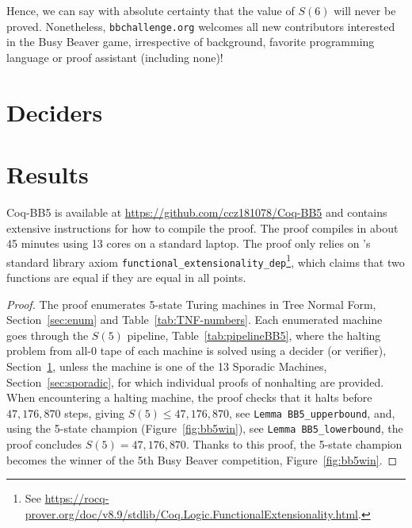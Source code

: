 \documentclass[a4paper,british]{article}
\theoremstyle{definition} %
\numberwithin{equation}{section}
\theoremstyle{definition} %
\newcommand{\numSporadic}{13\xspace}
\newcommand{\CoqBB}{Coq-BB5\xspace}
\begin{document}
Hence, we can say with absolute certainty that the value of $S(6)$ will never be proved. Nonetheless, \texttt{bbchallenge.org} welcomes all new contributors interested in the Busy Beaver game, irrespective of background, favorite programming language or proof assistant (including none)!



\newpage



\section{Deciders}\label{sec:deciders}







% 

\newpage




\newpage


\newpage
\section{Results}\label{sec:results}

\CoqBB is available at \url{https://github.com/ccz181078/Coq-BB5} and contains extensive instructions for how to compile the proof. The proof compiles in about 45 minutes using 13 cores on a standard laptop. The proof only relies on \Coq's standard library axiom \texttt{functional\_extensionality\_dep}\footnote{See \url{https://rocq-prover.org/doc/v8.9/stdlib/Coq.Logic.FunctionalExtensionality.html}.}, which claims that two functions are equal if they are equal in all points.

\thBBTheFifth*
\begin{proof}
    The \Coq proof enumerates 5-state Turing machines in Tree Normal Form, Section~\ref{sec:enum} and Table~\ref{tab:TNF-numbers}. Each enumerated machine goes through the $S(5)$ pipeline, Table~\ref{tab:pipelineBB5}, where the halting problem from all-0 tape of each machine is solved using a decider (or verifier), Section~\ref{sec:deciders}, unless the machine is one of the \numSporadic Sporadic Machines, Section~\ref{sec:sporadic}, for which individual \Coq proofs of nonhalting are provided.
    When encountering a halting machine, the proof checks that it halts before $47{,}176{,}870$ steps, giving $S(5) \leq 47{,}176{,}870$, see \texttt{Lemma BB5\_upperbound}, and, using the 5-state champion (Figure~\ref{fig:bb5win}), see \texttt{Lemma BB5\_lowerbound}, the proof concludes $S(5) = 47{,}176{,}870$. Thanks to this proof, the 5-state champion becomes the winner of the 5th Busy Beaver competition, Figure~\ref{fig:bb5win}.
\end{proof}
\end{document}
